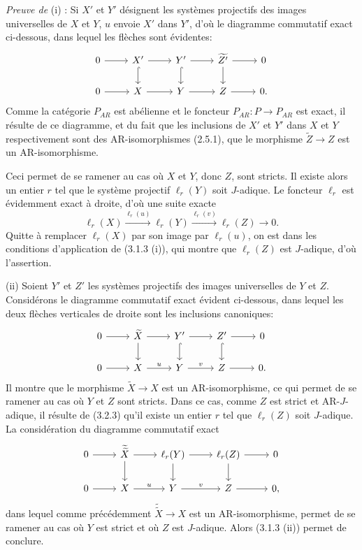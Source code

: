 \documentclass[11pt]{article}
\begin{document}
\emph{Preuve de} (i) : Si $X'$ et $Y'$ désignent les systèmes projectifs des images universelles de $X$ et $Y$, $u$ envoie $X'$ dans $Y'$, d'où le diagramme commutatif exact ci-dessous, dans lequel les flèches sont évidentes:
\[
\begin{tikzcd}
0 \arrow[r] & X' \arrow[r] \arrow[d,hook] & Y' \arrow[r] \arrow[d,hook] & \widetilde{Z'} \arrow[r] \arrow[d] & 0\\
0 \arrow[r] & X \arrow[r] & Y \arrow[r] & Z \arrow[r] & 0 .
\end{tikzcd}
\]
Comme la catégorie $P_{AR}$ est abélienne et le foncteur 
$P_{AR}\colon P\to P_{AR}$ est
exact, il résulte de ce diagramme, et du fait que les inclusions de $X'$ et $Y'$ dans $X$ et $Y$ respectivement sont des AR-isomorphismes (2.5.1), que le morphisme $\widetilde Z\to Z$ est un AR-isomorphisme.

Ceci permet de se ramener au cas où $X$ et $Y$, donc $Z$, sont stricts. Il existe alors un entier $r$ tel que le système projectif $\ell_r(Y)$ soit $J$-adique. Le foncteur $\ell_r$ est évidemment exact à droite, d'où une suite exacte
\[
\ell_r(X)\stackrel{\ell_r(u)}{\longrightarrow}\ell_r(Y)\stackrel{\ell_r(v)}{\longrightarrow}\ell_r(Z)\longrightarrow0.
\]
Quitte à remplacer $\ell_r(X)$ par son image par $\ell_r(u)$, on est dans les conditions d'application de (3.1.3 (i)), qui montre que $\ell_r(Z)$ est $J$-adique, d'où l'assertion.

(ii) Soient $Y'$ et $Z'$ les systèmes projectifs des images universelles de $Y$ et $Z$. Considérons le diagramme commutatif exact évident ci-dessous, dans lequel les deux flèches verticales de droite sont les inclusions canoniques:
\[
\begin{tikzcd}
0 \arrow[r] & \widetilde X \arrow[r] \arrow[d] & Y' \arrow[r] \arrow[d,hook] & Z' \arrow[r] \arrow[d,hook] & 0\\
0 \arrow[r] & X \arrow[r,"u"] & Y \arrow[r,"v"] & Z \arrow[r] & 0 .
\end{tikzcd}
\]
Il montre que le morphisme $\widetilde X\to X$ est un AR-isomorphisme, ce qui permet de se ramener au cas où $Y$ et $Z$ sont stricts. Dans ce cas, comme $Z$ est strict et AR-$J$-adique, il résulte de (3.2.3) qu'il existe un entier $r$ tel que $\ell_r(Z)$ soit $J$-adique. La considération du diagramme commutatif exact
\[
\begin{tikzcd}
0 \arrow[r] & \widetilde{\widetilde X} \arrow[r] \arrow[d] & \ell_r(Y) \arrow[r] \arrow[d] & \ell_r(Z) \arrow[r] \arrow[d] & 0\\
0 \arrow[r] & X \arrow[r,"u"] & Y \arrow[r,"v"] & Z \arrow[r] & 0,
\end{tikzcd}
\]
dans lequel comme précédemment $\widetilde{\widetilde X}\to X$ est un AR-isomorphisme, permet de se ramener au cas où $Y$ est strict et où $Z$ est $J$-adique. Alors 
(3.1.3 (ii))
permet de conclure.
\end{document}
